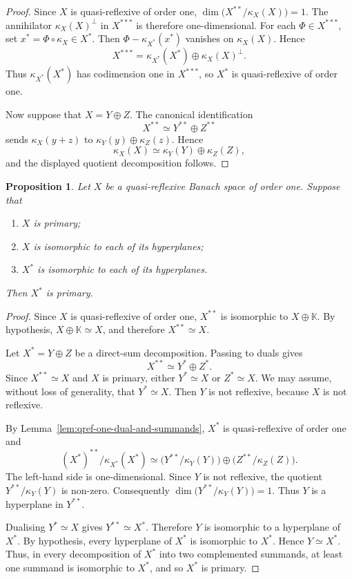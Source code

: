 \documentclass[11pt]{amsart}
\theoremstyle{plain}
\newtheorem{proposition}[theorem]{Proposition}
\theoremstyle{definition}
\numberwithin{equation}{section}
\begin{document}
\begin{proof}
Since $X$ is quasi-reflexive of order one,
\(
    \dim\bigl(X^{**}/\kappa_X(X)\bigr)=1.
\)
The annihilator $\kappa_X(X)^\perp$ in $X^{***}$ is therefore one-dimensional.
For each $\Phi\in X^{***}$, set $x^*=\Phi\circ\kappa_X\in X^*$. Then
\(
    \Phi-\kappa_{X^*}(x^*)
\)
vanishes on $\kappa_X(X)$. Hence
\[
    X^{***}=\kappa_{X^*}(X^*)\oplus \kappa_X(X)^\perp .
\]
Thus $\kappa_{X^*}(X^*)$ has codimension one in $X^{***}$, so $X^*$ is quasi-reflexive of order one.

Now suppose that $X=Y\oplus Z$. The canonical identification
\[
    X^{**}\simeq Y^{**}\oplus Z^{**}
\]
sends $\kappa_X(y+z)$ to $\kappa_Y(y)\oplus\kappa_Z(z)$. Hence
\[
    \kappa_X(X)
        \simeq
    \kappa_Y(Y)\oplus\kappa_Z(Z),
\]
and the displayed quotient decomposition follows.
\end{proof}

\begin{proposition}\label{prop:qref-primary-dual}
Let $X$ be a quasi-reflexive Banach space of order one. Suppose that
\begin{enumerate}[label=\textup{(\roman*)}]
    \item $X$ is primary;
    \item $X$ is isomorphic to each of its hyperplanes;
    \item $X^*$ is isomorphic to each of its hyperplanes.
\end{enumerate}
Then $X^*$ is primary.
\end{proposition}

\begin{proof}
Since $X$ is quasi-reflexive of order one, $X^{**}$ is isomorphic to $X\oplus\mathbb K$. By hypothesis, $X\oplus\mathbb K\simeq X$, and therefore
\(
    X^{**}\simeq X .
\)

Let
\(
    X^*=Y\oplus Z
\)
be a direct-sum decomposition. Passing to duals gives
\[
    X^{**}\simeq Y^*\oplus Z^* .
\]
Since $X^{**}\simeq X$ and $X$ is primary, either $Y^*\simeq X$ or $Z^*\simeq X$. We may assume, without loss of generality, that
\(
    Y^*\simeq X .
\)
Then $Y$ is not reflexive, because $X$ is not reflexive.

By Lemma~\ref{lem:qref-one-dual-and-summands}, $X^*$ is quasi-reflexive of order one and
\[
    (X^*)^{**}/\kappa_{X^*}(X^*)
        \simeq
    \bigl(Y^{**}/\kappa_Y(Y)\bigr)
        \oplus
    \bigl(Z^{**}/\kappa_Z(Z)\bigr).
\]
The left-hand side is one-dimensional. Since $Y$ is not reflexive, the quotient $Y^{**}/\kappa_Y(Y)$ is non-zero. Consequently
\(
    \dim\bigl(Y^{**}/\kappa_Y(Y)\bigr)=1.
\)
Thus $Y$ is a hyperplane in $Y^{**}$.

Dualising $Y^*\simeq X$ gives
\(
    Y^{**}\simeq X^* .
\)
Therefore $Y$ is isomorphic to a hyperplane of $X^*$. By hypothesis, every hyperplane of $X^*$ is isomorphic to $X^*$. Hence $Y\simeq X^*$.
Thus, in every decomposition of $X^*$ into two complemented summands, at least one summand is isomorphic to $X^*$, and so $X^*$ is primary.
\end{proof}
\end{document}

